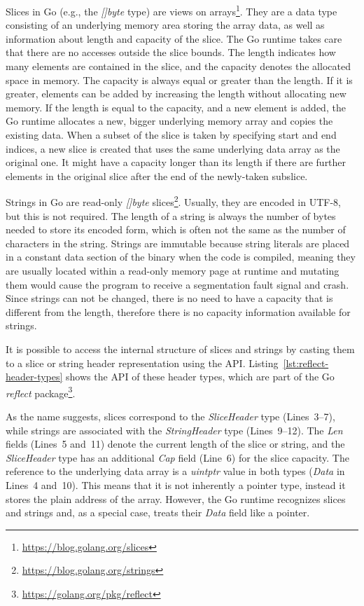 Slices in Go (e.g., the \textit{[]byte} type) are views on arrays\footnote{\url{https://blog.golang.org/slices}}.
They are a data type consisting of an underlying memory area storing the array data, as well as information about length
and capacity of the slice.
The Go runtime takes care that there are no accesses outside the slice bounds.
The length indicates how many elements are contained in the slice, and the capacity denotes the allocated space in
memory.
The capacity is always equal or greater than the length.
If it is greater, elements can be added by increasing the length without allocating new memory.
If the length is equal to the capacity, and a new element is added, the Go runtime allocates a new, bigger underlying
memory array and copies the existing data.
When a subset of the slice is taken by specifying start and end indices, a new slice is created that uses the same
underlying data array as the original one.
It might have a capacity longer than its length if there are further elements in the original slice after the end of
the newly-taken subslice.

Strings in Go are read-only \textit{[]byte} slices\footnote{\url{https://blog.golang.org/strings}}.
Usually, they are encoded in UTF-8, but this is not required.
The length of a string is always the number of bytes needed to store its encoded form, which is often not the same as
the number of characters in the string.
Strings are immutable because string literals are placed in a constant data section of the binary when the code is
compiled, meaning they are usually located within a read-only memory page at runtime and mutating them would cause
the program to receive a segmentation fault signal and crash.
Since strings can not be changed, there is no need to have a capacity that is different from the length, therefore there
is no capacity information available for strings.

It is possible to access the internal structure of slices and strings by casting them to a slice or string header
representation using the \unsafe{} \acrshort{API}.
Listing~\ref{lst:reflect-header-types} shows the \acrshort{API} of these header types, which are part of the Go
\textit{reflect} package\footnote{\url{https://golang.org/pkg/reflect}}.



As the name suggests, slices correspond to the \textit{SliceHeader} type (Lines~3--7), while strings are associated with
the \textit{StringHeader} type (Lines~9--12).
The \textit{Len} fields (Lines~5 and~11) denote the current length of the slice or string, and the \textit{SliceHeader}
type has an additional \textit{Cap} field (Line~6) for the slice capacity.
The reference to the underlying data array is a \textit{uintptr} value in both types (\textit{Data} in Lines~4 and~10).
This means that it is not inherently a pointer type, instead it stores the plain address of the array.
However, the Go runtime recognizes slices and strings and, as a special case, treats their \textit{Data} field like a
pointer.

